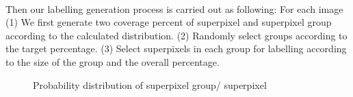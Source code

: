 \documentclass[runningheads,a4paper]{llncs}
\begin{document}
\paragraph{} Then our labelling generation process is carried out as following: For each image (1) We first generate two coverage percent of superpixel and superpixel group according to the calculated  distribution. (2) Randomly select groups according to the target percentage. (3) Select superpixels in each group for labelling according to the size of the group and the overall percentage.

\begin{figure}[!tb]
\centering

\caption{ Probability distribution of superpixel group/ superpixel  }
\label{fig: qq plot}
\end{figure}
\end{document}

